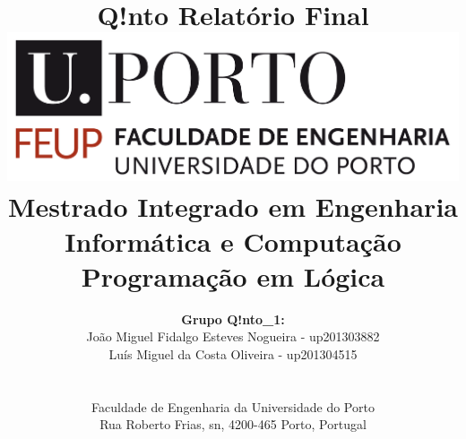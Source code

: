 \documentclass[a4paper]{article}
\begin{document}
	
	\setlength{\textwidth}{16cm}
	\setlength{\textheight}{22cm}
	
	\title{\Huge\textbf{Q!nto}\linebreak\linebreak\linebreak
	\Large\textbf{Relatório Final}\linebreak\linebreak
	\linebreak\linebreak
	\includegraphics[scale=0.1]{./res/feup-logo.png}\linebreak\linebreak
	\linebreak\linebreak
	\Large{Mestrado Integrado em Engenharia Informática e Computação} \linebreak\linebreak
	\Large{Programação em Lógica}\linebreak
		}
	

	\author{
	\textbf{Grupo Q!nto\_1:}\\
	João Miguel Fidalgo Esteves Nogueira - up201303882 \\
	Luís Miguel da Costa Oliveira - up201304515 \\
	\linebreak\linebreak \\
	 \\ Faculdade de Engenharia da Universidade do Porto \\ Rua Roberto Frias, s\/n, 4200-465 Porto, Portugal \linebreak\linebreak\linebreak
	\linebreak\linebreak\vspace{1cm}}
	
	\maketitle
	\thispagestyle{empty}
\end{document}
